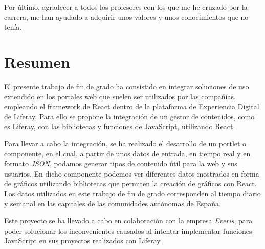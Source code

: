 \documentclass[a4paper, 12pt]{book}
\begin{document}
\vspace{5mm}
Por último, agradecer a todos los profesores con los que me he cruzado por la carrera, me han ayudado a adquirir unos valores y unos conocimientos que no tenía.




\chapter*{Resumen}
El presente trabajo de fin de grado ha consistido en integrar soluciones de uso extendido en los portales web que suelen ser utilizados por las compañías, empleando el framework de React dentro de la plataforma de Experiencia Digital de Liferay. Para ello se propone la integración de un gestor de contenidos, como es Liferay, con las bibliotecas y funciones de JavaScript, utilizando React.

\vspace{5mm}
Para llevar a cabo la integración, se ha realizado el desarrollo de un portlet o componente, en el cual, a partir de unos datos de entrada, en tiempo real y en formato \textit{JSON}, podamos generar tipos de contenido útil para la web y sus usuarios. En dicho componente podemos ver diferentes datos mostrados en forma de gráficos utilizando bibliotecas que permiten la creación de gráficos con React. Los datos utilizados en este trabajo de fin de grado corresponden al tiempo diario y semanal en las capitales de las comunidades autónomas de España.

\vspace{5mm}
Este proyecto se ha llevado a cabo en colaboración con la empresa \textit{Everis}, para poder solucionar los inconvenientes causados al intentar implementar funciones JavaScript en sus proyectos realizados con Liferay.





\end{document}
